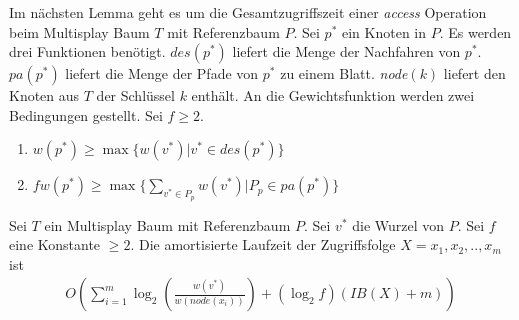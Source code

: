 \documentclass[a4paper,12pt]{article}
\begin{document}
\noindent Im nächsten Lemma geht es um die Gesamtzugriffszeit einer \textit{access} Operation beim Multisplay Baum $T$ mit Referenzbaum $P$. Sei $p^*$ ein Knoten in $P$. Es werden drei Funktionen benötigt. $\mathit{des}\left(p^*\right)$ liefert die Menge der Nachfahren von $p^*$.  $\mathit{pa}\left(p^*\right)$ liefert die Menge der Pfade von $p^*$ zu einem Blatt. \textit{node}$\left(k\right)$ liefert den Knoten aus $T$ der Schlüssel $k$ enthält. An die Gewichtsfunktion werden zwei Bedingungen gestellt. Sei $f \geq 2$.
\begin{enumerate}
	\item $w\left(p^*\right) \geq \max \{  w\left(v^*\right)\vert  v^*
	\in\mathit{des}\left(p^*\right)  \}$
	\item $f  w\left(p^*\right) \geq    \max \{  \sum_{v^* \in P_p }  w\left(v^*\right)\vert    P_p \in \mathit{pa}\left(p^*\right) \}  $
\end{enumerate}
\begin{Lemma2}
	Sei $T$ ein Multisplay Baum mit Referenzbaum $P$. Sei $v^*$ die Wurzel von $P$. Sei $f$ eine Konstante $\geq 2$. Die amortisierte Laufzeit der Zugriffsfolge $X = x_1, x_2,..,x_m$ ist 
\begin{align*}
O\left(  \sum_{i = 1}^{m} \log_2\left(   \frac{w\left(v^*\right)}{w\left(\textit{node}\left(x_i\right)\right)}  \right)  
+ \left(\log_2 f\right) \left(\mathit{IB}\left(X\right) + m\right) \right)
\end{align*}
\end{Lemma2}
\end{document}
